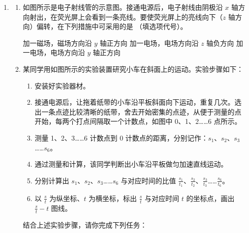 \documentclass[\gkver]{gaokaozhenti}
\begin{document}
\begin{enumerate}

\item
\begin{enumerate}
	\item
	如图所示是电子射线管的示意图。接通电源后，电子射线由阴极沿 $x$ 轴方向射出，在荧光屏上会看到一条亮线。要使荧光屏上的亮线向下（$z$ 轴方向）偏转，在下列措施中可采用的是 （填选项代号）。


	{加一磁场，磁场方向沿 $y$ 轴正方向}
	{加一电场，电场方向沿 $z$ 轴负方向}
	{加一电场，电场方向沿 $y$ 轴正方向}

	\item
	某同学用如图所示的实验装置研究小车在斜面上的运动。实验步骤如下：

	\begin{enumerate}[label=(\Alph*)]
		\item
		安装好实验器材。
		\item
		接通电源后，让拖着纸带的小车沿平板斜面向下运动，重复几次。选出一条点迹比较清晰的纸带，舍去开始密集的点迹，从便于测量的点开始，每两个打点间隔取一个计数点，如图中 0、1、2……6 点所示。
		\item
		测量 1、2、3……6 计数点到 0 计数点的距离，分别记作：$s_{1}$、$s_{2}$、$s_{3}$……$s_{6}$。
		\item
		通过测量和计算，该同学判断出小车沿平板做匀加速直线运动。
		\item
		分别计算出 $s_{1}$、$s_{2}$、$s_{3}$……$s_{6}$ 与对应时间的比值 $\frac{s_{1}}{t_{1}}$、$\frac{s_{2}}{t_{2}}$、$\frac{s_{3}}{t_{3}}$……$\frac{s_{6}}{t_{6}}$。
		\item
		以 $\frac{s}{t}$ 为纵坐标、$t$ 为横坐标，标出 $\frac{s}{t}$ 与对应时间 $t$ 的坐标点，画出 $\frac{s}{t}-t$ 图线。
	\end{enumerate}

	结合上述实验步骤，请你完成下列任务：

\end{enumerate}
\end{enumerate}
\end{document}
